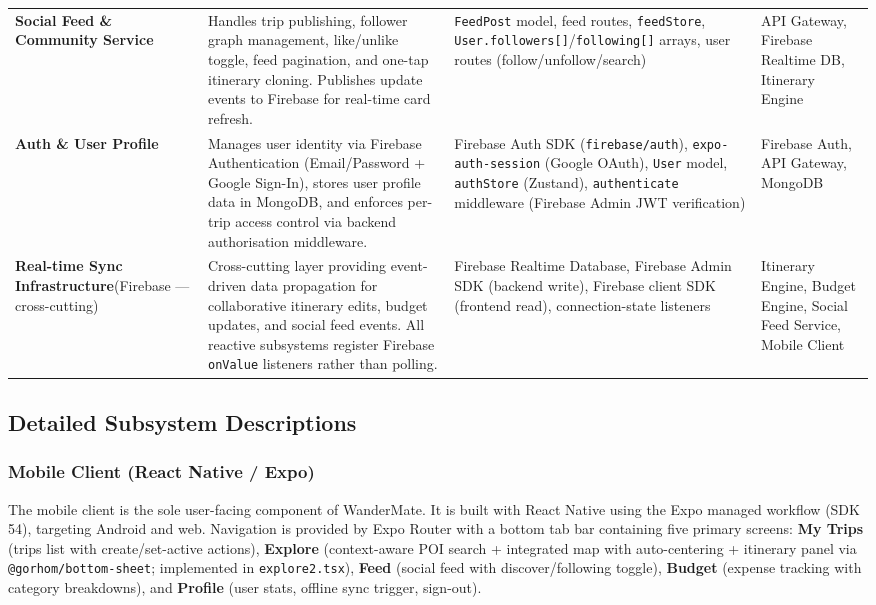 \documentclass[12pt, a4paper]{article}
\begin{document}
\begin{longtable}{L{3.0cm} L{4.8cm} L{3.8cm} L{2.2cm}}
\textbf{Social Feed \& Community Service} &
Handles trip publishing, follower graph management, like/unlike toggle, feed pagination, and one-tap itinerary cloning. Publishes update events to Firebase for real-time card refresh. &
\texttt{FeedPost} model, feed routes, \texttt{feedStore}, \texttt{User.followers[]}/\texttt{following[]} arrays, user routes (follow/unfollow/search) &
API Gateway, Firebase Realtime DB, Itinerary Engine \\

\textbf{Auth \& User Profile} &
Manages user identity via Firebase Authentication (Email/Password + Google Sign-In), stores user profile data in MongoDB, and enforces per-trip access control via backend authorisation middleware. &
Firebase Auth SDK (\texttt{firebase/auth}), \texttt{expo-auth-session} (Google OAuth), \texttt{User} model, \texttt{authStore} (Zustand), \texttt{authenticate} middleware (Firebase Admin JWT verification) &
Firebase Auth, API Gateway, MongoDB \\

\textbf{Real-time Sync Infrastructure}\newline(Firebase --- cross-cutting) &
Cross-cutting layer providing event-driven data propagation for collaborative itinerary edits, budget updates, and social feed events. All reactive subsystems register Firebase \texttt{onValue} listeners rather than polling. &
Firebase Realtime Database, Firebase Admin SDK (backend write), Firebase client SDK (frontend read), connection-state listeners &
Itinerary Engine, Budget Engine, Social Feed Service, Mobile Client \\

\end{longtable}

\subsection{Detailed Subsystem Descriptions}

\subsubsection{Mobile Client (React Native / Expo)}

The mobile client is the sole user-facing component of WanderMate. It is built with React Native using the Expo managed workflow (SDK 54), targeting Android and web. Navigation is provided by Expo Router with a bottom tab bar containing five primary screens: \textbf{My Trips} (trips list with create/set-active actions), \textbf{Explore} (context-aware POI search + integrated map with auto-centering + itinerary panel via \texttt{@gorhom/bottom-sheet}; implemented in \texttt{explore2.tsx}), \textbf{Feed} (social feed with discover/following toggle), \textbf{Budget} (expense tracking with category breakdowns), and \textbf{Profile} (user stats, offline sync trigger, sign-out).
\end{document}
